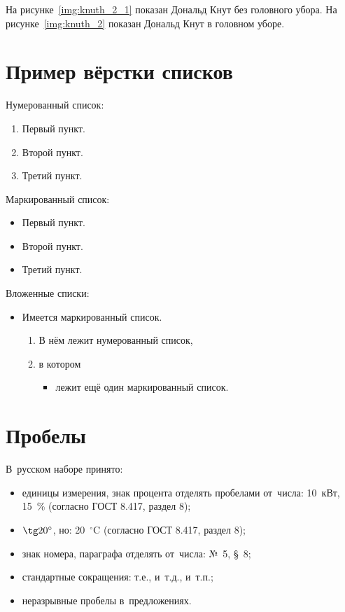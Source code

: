 На рисунке~\ref{img:knuth_2_1} показан Дональд Кнут без головного убора. На рисунке~\ref{img:knuth_2}  показан Дональд Кнут в головном уборе.

\section{Пример вёрстки списков} \label{sect2_3}

\noindent Нумерованный список:
\begin{enumerate}
  \item Первый пункт.
  \item Второй пункт.
  \item Третий пункт.
\end{enumerate}

\noindent Маркированный список:
\begin{itemize}
  \item Первый пункт.
  \item Второй пункт.
  \item Третий пункт.
\end{itemize}

\noindent Вложенные списки:
\begin{itemize}
  \item Имеется маркированный список.
  \begin{enumerate}
    \item В нём лежит нумерованный список,
    \item в котором
    \begin{itemize}
      \item лежит ещё один маркированный список.
    \end{itemize}    
  \end{enumerate}
\end{itemize}


\section{Пробелы}

В~русском наборе принято:
\begin{itemize}
    \item единицы измерения, знак процента отделять пробелами от~числа: 10~кВт, 15~\% (согласно ГОСТ 8.417, раздел 8);
    \item $\tg 20^\circ$, но: 20~${}^\circ$C (согласно ГОСТ 8.417, раздел 8);
    \item знак номера, параграфа отделять от~числа: №~5, \S~8;
    \item стандартные сокращения: т.\:е., и~т.\:д., и~т.\:п.;
    \item неразрывные пробелы в~предложениях.
\end{itemize}


